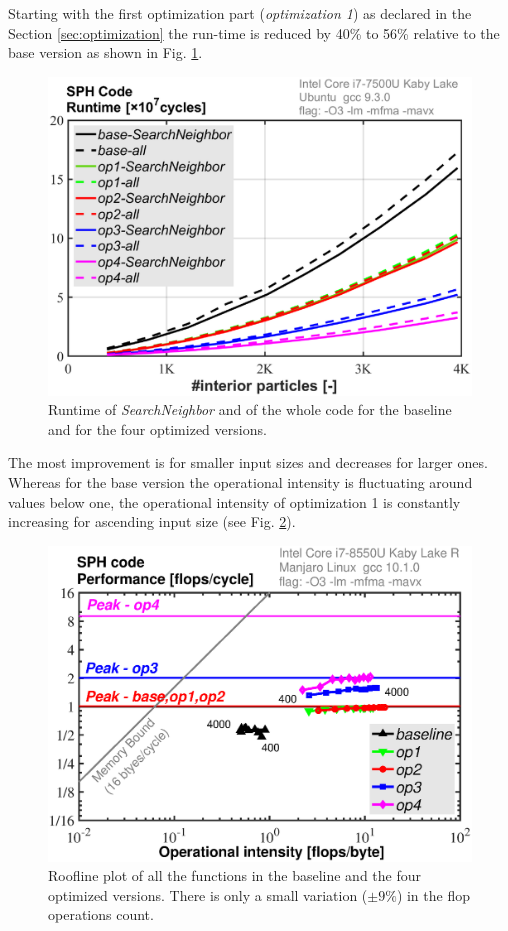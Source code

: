 \documentclass[letterpaper]{article}
\begin{document}
Starting with the first optimization part (\emph{optimization 1}) as declared in the Section \ref{sec:optimization} the run-time is reduced by 40\% to 56\% relative to the base version as shown in Fig. \ref{fig:runtime}.
\begin{figure}
    \centering
    \includegraphics[trim={1.2cm 0.3cm 2.2cm 0.6cm},clip, width=\linewidth]{runtime.eps}
    \caption{Runtime of \emph{SearchNeighbor} and of the whole code for the baseline and for the four optimized versions.}
    \label{fig:runtime}
\end{figure}
The most improvement is for smaller input sizes and decreases for larger ones. 
Whereas for the base version the operational intensity is fluctuating around values below one, the operational intensity of optimization 1 is constantly increasing for ascending input size (see Fig. \ref{fig:roofline}).
\begin{figure}
    \centering
    \includegraphics[trim={1.2cm 0.3cm 2.2cm 0.9cm},clip, width=\linewidth]{roofline.eps}
    \caption{Roofline plot of all the functions in the baseline and the four optimized versions. There is only a small variation ($\pm 9\%$) in the flop operations count.}
    \label{fig:roofline}
\end{figure}
\end{document}
